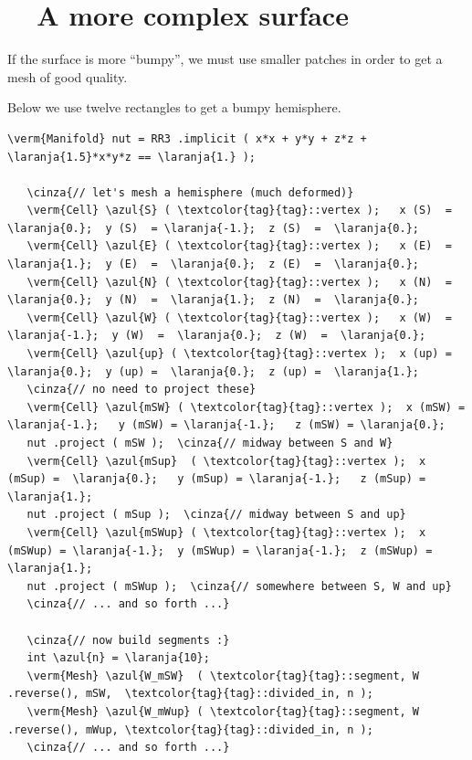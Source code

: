 \section{~~A more complex surface}\label{\numb section 2.\numb parag 7}

If the surface is more ``bumpy'',
we must use smaller patches in order to get a mesh of good quality.

Below we use twelve rectangles to get a bumpy hemisphere.

\begin{Verbatim}[commandchars=\\\{\},formatcom=\small\tt,frame=single,
   label=parag-\ref{\numb section 2.\numb parag 7}.cpp,rulecolor=\color{coment},
   baselinestretch=0.94,framesep=2mm]
   \verm{Manifold} nut = RR3 .implicit ( x*x + y*y + z*z + \laranja{1.5}*x*y*z == \laranja{1.} );

   \cinza{// let's mesh a hemisphere (much deformed)}
   \verm{Cell} \azul{S} ( \textcolor{tag}{tag}::vertex );   x (S)  =  \laranja{0.};  y (S)  = \laranja{-1.};  z (S)  =  \laranja{0.};
   \verm{Cell} \azul{E} ( \textcolor{tag}{tag}::vertex );   x (E)  =  \laranja{1.};  y (E)  =  \laranja{0.};  z (E)  =  \laranja{0.};
   \verm{Cell} \azul{N} ( \textcolor{tag}{tag}::vertex );   x (N)  =  \laranja{0.};  y (N)  =  \laranja{1.};  z (N)  =  \laranja{0.};
   \verm{Cell} \azul{W} ( \textcolor{tag}{tag}::vertex );   x (W)  = \laranja{-1.};  y (W)  =  \laranja{0.};  z (W)  =  \laranja{0.};
   \verm{Cell} \azul{up} ( \textcolor{tag}{tag}::vertex );  x (up) =  \laranja{0.};  y (up) =  \laranja{0.};  z (up) =  \laranja{1.};
   \cinza{// no need to project these}
   \verm{Cell} \azul{mSW} ( \textcolor{tag}{tag}::vertex );  x (mSW) = \laranja{-1.};   y (mSW) = \laranja{-1.};   z (mSW) = \laranja{0.};
   nut .project ( mSW );  \cinza{// midway between S and W}
   \verm{Cell} \azul{mSup}  ( \textcolor{tag}{tag}::vertex );  x (mSup) =  \laranja{0.};   y (mSup) = \laranja{-1.};   z (mSup) = \laranja{1.};
   nut .project ( mSup );  \cinza{// midway between S and up}
   \verm{Cell} \azul{mSWup} ( \textcolor{tag}{tag}::vertex );  x (mSWup) = \laranja{-1.};  y (mSWup) = \laranja{-1.};  z (mSWup) = \laranja{1.};
   nut .project ( mSWup );  \cinza{// somewhere between S, W and up}
   \cinza{// ... and so forth ...}

   \cinza{// now build segments :}
   int \azul{n} = \laranja{10};
   \verm{Mesh} \azul{W_mSW}  ( \textcolor{tag}{tag}::segment, W .reverse(), mSW,  \textcolor{tag}{tag}::divided_in, n );
   \verm{Mesh} \azul{W_mWup} ( \textcolor{tag}{tag}::segment, W .reverse(), mWup, \textcolor{tag}{tag}::divided_in, n );
   \cinza{// ... and so forth ...}


\end{Verbatim}
